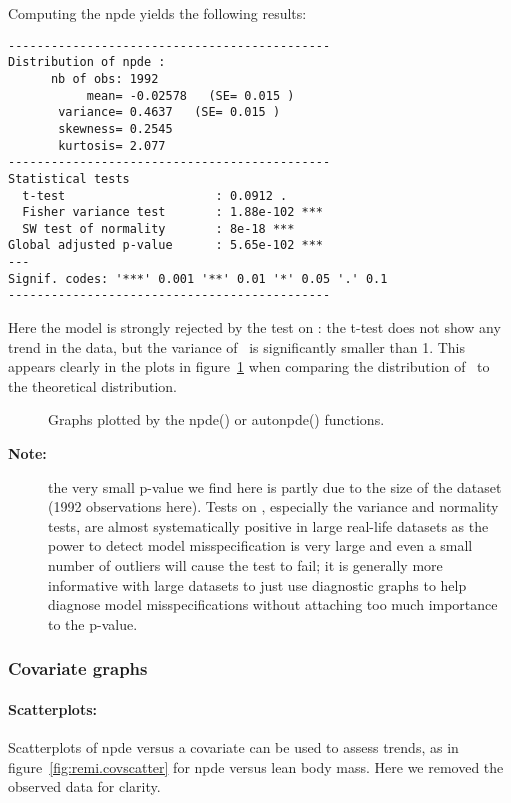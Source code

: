 Computing the npde yields the following results:
\begin{verbatim}
---------------------------------------------
Distribution of npde :
      nb of obs: 1992
           mean= -0.02578   (SE= 0.015 )
       variance= 0.4637   (SE= 0.015 )
       skewness= 0.2545
       kurtosis= 2.077
---------------------------------------------
Statistical tests
  t-test                     : 0.0912 .
  Fisher variance test       : 1.88e-102 ***
  SW test of normality       : 8e-18 ***
Global adjusted p-value      : 5.65e-102 ***
---
Signif. codes: '***' 0.001 '**' 0.01 '*' 0.05 '.' 0.1
---------------------------------------------
\end{verbatim}
Here the model is strongly rejected by the test on \npde: the t-test does not show any trend in the data, but the variance of \npde~is significantly smaller than 1. This appears clearly in the plots in figure~\ref{fig:remi.default} when comparing the distribution of \npde~to the theoretical distribution. 
\begin{figure}[!h]
\par\kern -0.3cm
\begin{center}
\end{center}
\caption{Graphs plotted by the {\sf npde()} or {\sf autonpde()}
functions.}\label{fig:remi.default}
\end{figure}
\newpage

\begin{description}
\item[{\bf Note:}] the very small p-value we find here is partly due to the size of the dataset (1992 observations here). Tests on \npde, especially the variance and normality tests, are almost systematically positive in large real-life datasets as the power to detect model misspecification is very large and even a small number of outliers will cause the test to fail; it is generally more informative with large datasets to just use diagnostic graphs to help diagnose model misspecifications without attaching too much importance to the p-value.
\end{description}
 
\subsubsection{Covariate graphs}

\paragraph{Scatterplots:} Scatterplots of npde versus a covariate can be used to assess trends, as in figure~\ref{fig:remi.covscatter} for npde versus lean body mass. Here we removed the observed data for clarity.

